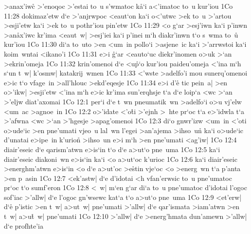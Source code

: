>anax'iw\r{c}
>'enoqoc
>'estai
to~u
s'wmatoc
k\r{a}`i
a<'imatoc
to~u
kur'iou\bibvsend
\vs 1Co 11:28
dokimaz'etw
d`e
>'anjrwpoc
<eaut`on
ka`i
o<'utwc
>ek
to~u
>'artou
>esji'etw
ka`i
>ek
to~u
pothr'iou
pin'etw\bibvsend
\vs 1Co 11:29
<o
g`ar
>esj'iwn
ka`i
p'inwn
>an\r{a}x'iwc
kr'ima
<eaut~w|
>esj'iei
ka`i
p'inei
m`h
diakr'inwn
t`o
s~wma
to~u\r{}
kur'iou\bibvsend
\vs 1Co 11:30
di`a
to~uto
>en
<um~in
pollo`i
>asjene~ic
ka`i
>'arrwstoi
ka`i
koim~wntai
<ikano'i\bibvsend
\vs 1Co 11:31
e>i
\r{g}`ar
<eauto`uc
diekr'inomen
o>uk
>`an
>ekrin'omeja\bibvsend
\vs 1Co 11:32
krin'omenoi
d`e
<u\r{p}`o
kur'iou
paideu'omeja
<'ina
m`h
s`un
t~w|
k'osmw|
katakrij~wmen\bibvsend
\vs 1Co 11:33
<'wste
>adelfo'i
mou
sunerq'omenoi
e>ic
t`o
vfage~in
>all'hlouc
>ekd'eqesje\bibvsend
\vs 1Co 11:34
e>i
d'e\r{}
tic
pein~a|
>en
o>'ikw|
>esji'etw
<'ina
m`h
e>ic
kr'ima
sun'erqhsje
t`a
d`e
loip`a
<wc
>`an
>'eljw
diat'axomai\bibvsend
\vs 1Co 12:1
per`i
d`e
t~wn
pneumatik~wn
>adelfo`i
o>u
vj'elw
<um~ac
>agnoe~in\bibvsend
\vs 1Co 12:2
o>'idate
<'o\r{t}i
>'ejnh
>~hte
pr`oc
t`a
e>'idwla
t`a
>'afwna
<wc
>`an
>'hgesje
>apag'omenoi\bibvsend
\vs 1Co 12:3
di`o
gnwr'izw
<um~in
<'oti
o>ude`ic
>en
pne'umati
vjeo~u
lal~wn
l'egei
>an'ajema
>ihso~u\r{n}
ka`i
o>ude`ic
d'unatai
e>ipe~in
k'urion\r{}
>ihso~un
e>i
m`h
>en
pne'umati
<ag'iw|\bibvsend
\vs 1Co 12:4
diair'eseic
d`e
qarism'atwn
e>is`in
t`o
d`e
a>ut`o
pne~uma\bibvsend
\vs 1Co 12:5
ka`i
diair'eseic
diakoni~wn
e>is`in
ka`i
<o
a>ut`oc
k'urioc\bibvsend
\vs 1Co 12:6
ka`i
diair'eseic
>energhm'atwn
e>is`in
<o
d`e
a>ut'oc
>e\r{s}tin
vje`oc
<o
>energ~wn
t`a
p'anta
>en
p~asin\bibvsend
\vs 1Co 12:7
<ek'astw|
d`e
d'idotai
<h
vfan'erwsic
to~u
pne'umatoc
pr`oc
t`o
sumf'eron\bibvsend
\vs 1Co 12:8
<~w|
m`en
g`ar
di`a
to~u
pne'umatoc
d'idotai
l'ogoc
sof'iac
>'allw|
d`e
l'ogoc
gn'wsewc
kat`a
t`o
a>ut`o
pne~uma\bibvsend
\vs 1Co 12:9
<et'erw|
d`e\r{}
p'istic
>en
t~w|
a>ut~w|
pne'umati
>'allw|
d`e
qar'ismata
>iam'atwn
>en
t~w|
a>u\r{t}~w|
pne'umati\bibvsend
\vs 1Co 12:10
>'allw|
d`e
>energ'hmata
dun'amewn
>'allw|
d`e
profhte'ia
